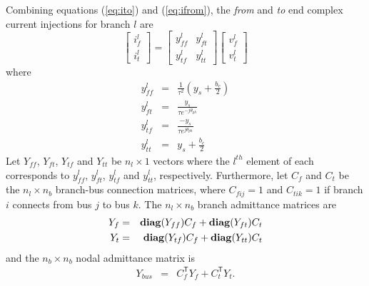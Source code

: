 Combining equations (\ref{eq:ito}) and (\ref{eq:ifrom}), the \textit{from}
and \textit{to} end complex current injections for branch $l$ are
\begin{equation}
\label{eq:ybranch}
\begin{bmatrix}
i_f^l\\
i_t^l
\end{bmatrix}
=
\begin{bmatrix}
y_{ff}^l& y_{ft}^l\\
y_{tf}^l& y_{tt}^l
\end{bmatrix}
\begin{bmatrix}
v_f^l\\
v_t^l
\end{bmatrix}
\end{equation}
where
\begin{eqnarray}
\label{eq:yff}
y_{ff}^l& =& \frac{1}{\tau^2} \left(y_s + \frac{b_c}{2}\right)\\
\label{eq:yft}
y_{ft}^l& =& \frac{y_s}{\tau e^{-j\theta_{ph}}}\\
\label{eq:ytf}
y_{tf}^l& =& \frac{-y_s}{\tau e^{j\theta_{ph}}}\\
\label{eq:ytt}
y_{tt}^l& =& y_s + \frac{b_c}{2}
\end{eqnarray}
Let $Y_{ff}$, $Y_{ft}$, $Y_{tf}$ and $Y_{tt}$ be $n_l \times 1$ vectors where
the $l^{th}$ element of each corresponds to $y_{ff}^l$, $y_{ft}^l$,
$y_{tf}^l$ and $y_{tt}^l$, respectively.  Furthermore, let $C_f$ and $C_t$ be the
$n_l \times n_b$ branch-bus connection matrices, where $C_{fij} = 1$ and
$C_{tik} = 1$ if branch $i$ connects from bus $j$ to bus $k$.  The
$n_l \times n_b$ branch admittance matrices are
\begin{eqnarray}
Y_f& =& \mathop{\mathbf{diag}}(Y_{ff})C_f + \mathop{\mathbf{diag}}(Y_{ft})C_t\\
Y_t& =& \mathop{\mathbf{diag}}(Y_{tf})C_f + \mathop{\mathbf{diag}}(Y_{tt})C_t
\end{eqnarray}
and the
$n_b \times n_b$ nodal admittance matrix is
\begin{eqnarray}
Y_{bus}& =& C_f^\mathsf{T} Y_f + C_t^\mathsf{T} Y_t .
\end{eqnarray}

